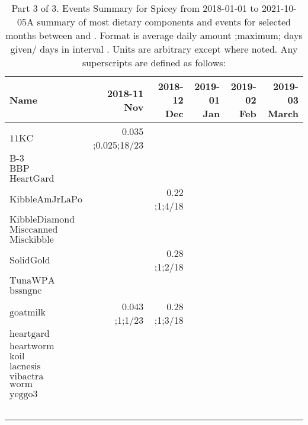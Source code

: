 \begin{table}[H]
\centering
\begin{tabular}{|l|r|r|r|r|r|}
\hline
Name&2018-11 Nov&2018-12 Dec&2019-01 Jan&2019-02 Feb&2019-03 March\\
\hline
$\textrm{11KC}$&0.035 ;0.025;18/23&&&&\\
$\textrm{B-3}$&&&&&\\
$\textrm{BBP}$&&&&&\\
$\textrm{HeartGard}$&&&&&\\
$\textrm{KibbleAmJrLaPo}$&&0.22 ;1;4/18&&&\\
$\textrm{KibbleDiamond}$&&&&&\\
$\textrm{Misccanned}$&&&&&\\
$\textrm{Misckibble}$&&&&&\\
$\textrm{SolidGold}$&&0.28 ;1;2/18&&&\\
$\textrm{TunaWPA}$&&&&&\\
$\textrm{bssngnc}$&&&&&\\
$\textrm{goatmilk}$&0.043 ;1;1/23&0.28 ;1;3/18&&&\\
$\textrm{heartgard}$&&&&&\\
$\textrm{heartworm}$&&&&&\\
$\textrm{koil}$&&&&&\\
$\textrm{lacnesis}$&&&&&\\
$\textrm{vibactra}$&&&&&\\
$\textrm{worm}$&&&&&\\
$\textrm{yeggo3}$&&&&&\\
&&&&&\\
&&&&&\\
&&&&&\\
&&&&&\\
&&&&&\\
\hline
\end{tabular}
\caption{Part 3 of 3.  Events Summary for Spicey   from 2018-01-01 to 2021-10-05A summary of most dietary components and events  for selected months between \mjmdatemin and \mjmdatemax. Format is average daily amount ;maximum; days given/ days in interval . Units are arbitrary except where noted. Any  superscripts are defined as follows:  \mjmsuperscripts}
\end{table}
